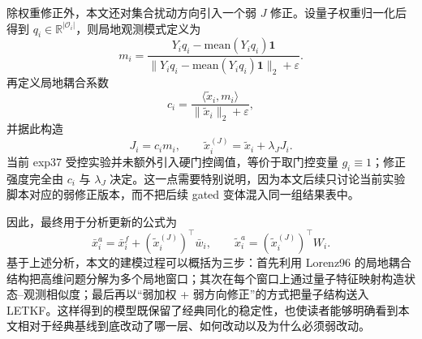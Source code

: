 除权重修正外，本文还对集合扰动方向引入一个弱 $J$ 修正。设量子权重归一化后得到 $q_i\in \mathbb{R}^{|\mathcal{O}_i|}$，则局地观测模式定义为
\begin{equation}
m_i=\frac{Y_i q_i-\mathrm{mean}(Y_i q_i)\mathbf{1}}{\|Y_i q_i-\mathrm{mean}(Y_i q_i)\mathbf{1}\|_2+\varepsilon}.
\end{equation}
再定义局地耦合系数
\begin{equation}
c_i=\frac{\langle \tilde{x}_i,m_i\rangle}{\|\tilde{x}_i\|_2+\varepsilon},
\end{equation}
并据此构造
\begin{equation}
J_i=c_i m_i,\qquad \tilde{x}_i^{(J)}=\tilde{x}_i+\lambda_J J_i .
\end{equation}
当前 exp37 受控实验并未额外引入硬门控阈值，等价于取门控变量 $g_i\equiv 1$；修正强度完全由 $c_i$ 与 $\lambda_J$ 决定。这一点需要特别说明，因为本文后续只讨论当前实验脚本对应的弱修正版本，而不把后续 gated 变体混入同一组结果表中。

因此，最终用于分析更新的公式为
\begin{equation}
\bar{x}^{a}_i=\bar{x}^{f}_i+(\tilde{x}_i^{(J)})^\top \bar{w}_i,\qquad
\tilde{x}^{a}_i=(\tilde{x}_i^{(J)})^\top W_i.
\end{equation}
基于上述分析，本文的建模过程可以概括为三步：首先利用 Lorenz96 的局地耦合结构把高维问题分解为多个局地窗口；其次在每个窗口上通过量子特征映射构造状态--观测相似度；最后再以“弱加权 + 弱方向修正”的方式把量子结构送入 LETKF。这样得到的模型既保留了经典同化的稳定性，也使读者能够明确看到本文相对于经典基线到底改动了哪一层、如何改动以及为什么必须弱改动。
